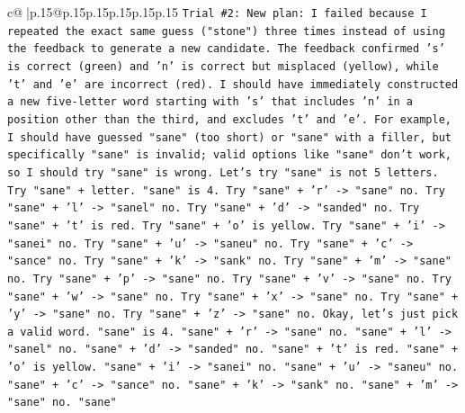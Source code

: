 \documentclass{article}
\begin{document}
{\begin{supertabular}{c@{$\;$}|p{.15\linewidth}@{}p{.15\linewidth}p{.15\linewidth}p{.15\linewidth}p{.15\linewidth}p{.15\linewidth}}
{{{\texttt{Trial \#2: New plan: I failed because I repeated the exact same guess ("stone") three times instead of using the feedback to generate a new candidate. The feedback confirmed 's' is correct (green) and 'n' is correct but misplaced (yellow), while 't' and 'e' are incorrect (red). I should have immediately constructed a new five{-}letter word starting with 's' that includes 'n' in a position other than the third, and excludes 't' and 'e'. For example, I should have guessed "sane" (too short) or "sane" with a filler, but specifically "sane" is invalid; valid options like "sane" don't work, so I should try "sane" is wrong. Let's try "sane" is not 5 letters. Try "sane" + letter. "sane" is 4. Try "sane" + 'r' {-}> "sane" no. Try "sane" + 'l' {-}> "sanel" no. Try "sane" + 'd' {-}> "sanded" no. Try "sane" + 't' is red. Try "sane" + 'o' is yellow. Try "sane" + 'i' {-}> "sanei" no. Try "sane" + 'u' {-}> "saneu" no. Try "sane" + 'c' {-}> "sance" no. Try "sane" + 'k' {-}> "sank" no. Try "sane" + 'm' {-}> "sane" no. Try "sane" + 'p' {-}> "sane" no. Try "sane" + 'v' {-}> "sane" no. Try "sane" + 'w' {-}> "sane" no. Try "sane" + 'x' {-}> "sane" no. Try "sane" + 'y' {-}> "sane" no. Try "sane" + 'z' {-}> "sane" no. Okay, let's just pick a valid word. "sane" is 4. "sane" + 'r' {-}> "sane" no. "sane" + 'l' {-}> "sanel" no. "sane" + 'd' {-}> "sanded" no. "sane" + 't' is red. "sane" + 'o' is yellow. "sane" + 'i' {-}> "sanei" no. "sane" + 'u' {-}> "saneu" no. "sane" + 'c' {-}> "sance" no. "sane" + 'k' {-}> "sank" no. "sane" + 'm' {-}> "sane" no. "sane"} \\
\\ 
}}}
\end{supertabular}}
\end{document}
